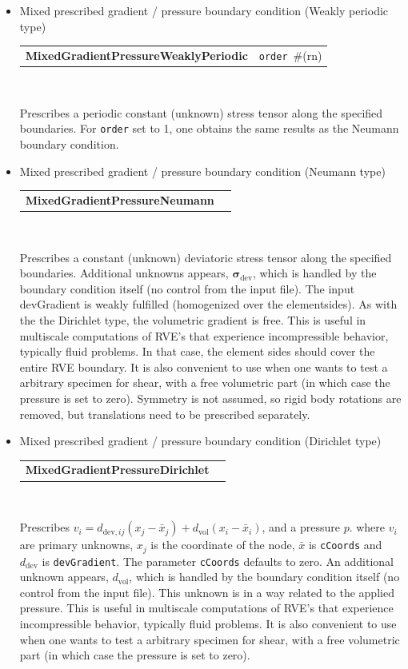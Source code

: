 \documentclass[a4paper]{article}
\makeatletter
\newcommand{\tens}[1]{\boldsymbol{#1}} %
\newcommand{\dev}{\mathrm{dev}}
\newcommand{\vol}{\mathrm{vol}}
\newcommand{\param}[1]{\texttt{#1}} %
\newcommand{\field}[2]{\param{#1}~\#{\tiny(#2)}} %
\newcommand{\entKeywordInst}[1]{\textbf{#1}} %
\newenvironment{record}[1][]{\begin{tabular}{|ll}}{\end{tabular}\\}
\newcommand{\recentry}[2]{{#1}&{#2}\\}
\newcounter{rcc}
\newenvironment{record}[1][\textwidth]{\setcounter{rcc}{0}\begin{tabular*}{#1}{|ll@{\extracolsep{\fill}}r}}{\end{tabular*}\\}
\newcommand{\recentry}[2]{\ifthenelse{\value{rcc}>0}{&$\backslash$ \\}{\setcounter{rcc}{1}}{#1}&{#2}}
\makeatother
\begin{document}
\begin{itemize}
\item Mixed prescribed gradient / pressure boundary condition (Weakly periodic type)

\begin{record}[0.9\textwidth]
  \recentry{\entKeywordInst{MixedGradientPressureWeaklyPeriodic}}{\field{order}{rn}}
\end{record}

Prescribes a periodic constant (unknown) stress tensor along the specified boundaries. For \param{order} set to 1, one obtains the same results as the Neumann boundary condition.


\item Mixed prescribed gradient / pressure boundary condition (Neumann type)

\begin{record}[0.9\textwidth]
  \recentry{\entKeywordInst{MixedGradientPressureNeumann}}{}
\end{record}

Prescribes a constant (unknown) deviatoric stress tensor along the specified boundaries.
Additional unknowns appears, $\tens{\sigma}_\dev$, which is handled by the boundary condition itself (no control from the input file).
The input devGradient is weakly fulfilled (homogenized over the elementsides). As with the the Dirichlet type, the volumetric gradient is free.
This is useful in multiscale computations of RVE's that experience incompressible behavior, typically fluid problems. In that case, the element sides should cover the entire RVE boundary.
It is also convenient to use when one wants to test a arbitrary specimen for shear, with a free volumetric part (in which case the pressure is set to zero).
Symmetry is not assumed, so rigid body rotations are removed, but translations need to be prescribed separately.

\item Mixed prescribed gradient / pressure boundary condition (Dirichlet type)

\begin{record}[0.9\textwidth]
  \recentry{\entKeywordInst{MixedGradientPressureDirichlet}}{}
\end{record}

Prescribes $ v_i = d_{\dev,ij}(x_j-\bar{x}_j) + d_\vol(x_i-\bar{x}_i)$, and a pressure $p$.
where $ v_i $ are primary unknowns, $x_j$ is the coordinate of the node, $\bar x$ is \param{cCoords} and $d_\dev$ is \param{devGradient}.
The parameter \param{cCoords} defaults to zero.
An additional unknown appears, $d_\vol$, which is handled by the boundary condition itself (no control from the input file).
This unknown is in a way related to the applied pressure.
This is useful in multiscale computations of RVE's that experience incompressible behavior, typically fluid problems. 
It is also convenient to use when one wants to test a arbitrary specimen for shear, with a free volumetric part (in which case the pressure is set to zero).




\end{itemize}
\end{document}
